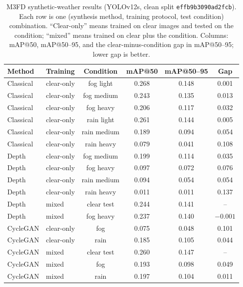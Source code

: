 \documentclass[11pt,a4paper]{article}
\begin{document}
\begin{table}[H]
\centering
\footnotesize
\caption{M3FD synthetic-weather results (YOLOv12s, clean split
\texttt{effb9b3090ad2fcb}). Each row is one (synthesis method, training protocol,
test condition) combination. ``Clear-only'' means trained on clear images and
tested on the condition; ``mixed'' means trained on clear plus the condition.
Columns: mAP@50, mAP@50--95, and the clear-minus-condition gap in mAP@50--95;
lower gap is better.}
\label{tab:m3fd}
\begin{tabular}{@{}llcccc@{}}
\toprule
Method & Training & Condition & mAP@50 & mAP@50--95 & Gap \\
\midrule
Classical   & clear-only & fog light   & 0.268 & 0.148 & 0.001 \\
Classical   & clear-only & fog medium  & 0.243 & 0.135 & 0.013 \\
Classical   & clear-only & fog heavy   & 0.206 & 0.117 & 0.032 \\
Classical   & clear-only & rain light  & 0.261 & 0.144 & 0.005 \\
Classical   & clear-only & rain medium & 0.189 & 0.094 & 0.054 \\
Classical   & clear-only & rain heavy  & 0.079 & 0.041 & 0.108 \\
\midrule
Depth       & clear-only & fog medium  & 0.199 & 0.114 & 0.035 \\
Depth       & clear-only & fog heavy   & 0.097 & 0.072 & 0.076 \\
Depth       & clear-only & rain medium & 0.094 & 0.054 & 0.054 \\
Depth       & clear-only & rain heavy  & 0.011 & 0.011 & 0.137 \\
Depth       & mixed      & clear test  & 0.244 & 0.141 & -- \\
Depth       & mixed      & fog heavy   & 0.237 & 0.140 & $-0.001$ \\
\midrule
CycleGAN    & clear-only & fog         & 0.075 & 0.048 & 0.101 \\
CycleGAN    & clear-only & rain        & 0.185 & 0.105 & 0.044 \\
CycleGAN    & mixed      & clear test  & 0.260 & 0.147 & -- \\
CycleGAN    & mixed      & fog         & 0.193 & 0.098 & 0.049 \\
CycleGAN    & mixed      & rain        & 0.197 & 0.104 & 0.011 \\
\bottomrule\end{tabular}
\end{table}
\end{document}

